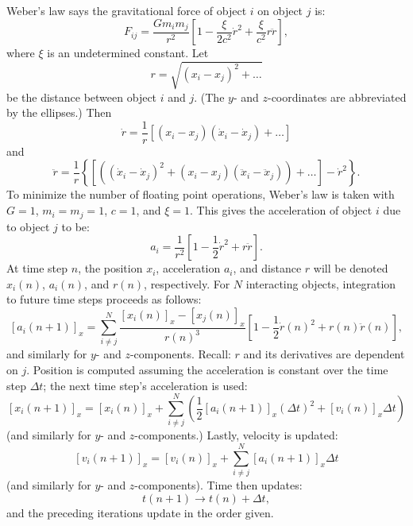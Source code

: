 \documentclass{article}
\begin{document}
Weber's law says the gravitational force of object $i$ on object $j$ is: $$F_{ij}=\frac{Gm_im_j}{r^2}\left[1-\frac{\xi}{2c^2}\dot{r}^2+\frac{\xi}{c^2}r\ddot{r}\right],$$ where $\xi$ is an undetermined constant. Let $$r=\sqrt{(x_i-x_j)^2+\ldots}$$ be the distance between object $i$ and $j$. (The $y$- and $z$-coordinates are abbreviated by the ellipses.) Then $$\dot{r}=\frac{1}{r}\left[(x_i-x_j)(\dot{x}_i-\dot{x}_j)+\ldots\right]$$ and $$\ddot{r}=\frac{1}{r}\left\{\left[\left((\dot{x}_i-\dot{x}_j)^2+(x_i-x_j)(\ddot{x}_i-\ddot{x}_j)\right)+\ldots\right]-\dot{r}^2\right\}.$$ To minimize the number of floating point operations, Weber's law is taken with $G=1$, $m_i=m_j=1$, $c=1$, and $\xi=1$. This gives the acceleration of object $i$ due to object $j$ to be:  $$a_i=\frac{1}{r^2}\left[1-\frac{1}{2}\dot{r}^2+r\ddot{r}\right].$$ At time step $n$, the position $x_i$, acceleration $a_i$, and distance $r$ will be denoted $x_i(n)$, $a_i(n)$, and $r(n)$, respectively. For $N$ interacting objects, integration to future time steps proceeds as follows: $$\left[a_i(n+1)\right]_x=\sum_{i\ne j}^{N}\frac{[x_i(n)]_x-[x_j(n)]_x}{r(n)^3}\left[1-\frac{1}{2}\dot{r}(n)^2+r(n)\ddot{r}(n)\right],$$ and similarly for $y$- and $z$-components. Recall: $r$ and its derivatives are dependent on $j$. Position is computed assuming the acceleration is constant over the time step $\Delta t$; the next time step's acceleration is used: $$[x_i(n+1)]_x=[x_i(n)]_x+\sum_{i\ne j}^{N}\left(\frac{1}{2}[a_i(n+1)]_x(\Delta t)^2+[v_i(n)]_x\Delta t\right)$$ (and similarly for $y$- and $z$-components.) Lastly, velocity is updated:$$[v_i(n+1)]_x=[v_i(n)]_x+\sum_{i\ne j}^{N}[a_i(n+1)]_x\Delta t$$ (and similarly for $y$- and $z$-components). Time then updates:$$t(n+1)\rightarrow t(n)+\Delta t,$$and the preceding iterations update in the order given.
\end{document}
